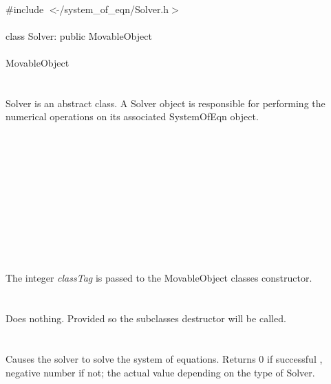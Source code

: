 
   \\
\indent \#include $<\tilde{ }$/system\_of\_eqn/Solver.h$>$  \\

  \\
\indent class Solver:  public MovableObject \\

 \\
\indent MovableObject \\
\indent{} \\

  \\
\indent Solver is an abstract class. A Solver object is responsible for performing
the numerical operations on its associated SystemOfEqn object. \\

 \\
\indent{}  \\ 
\indent{}  \\ \\
\indent{}  \\ 
\indent{}\\  \\
\indent{}  \\ 
\indent{} \\


  \\
  \\
The integer {\em classTag} is passed to the MovableObject classes
constructor. \\ 

 \\
\\ 
Does nothing. Provided so the subclasses destructor will be called. \\

  \\
 \\
Causes the solver to solve the system of equations. Returns $0$ if
successful , negative number if not; the actual value depending on
the type of Solver.\\




